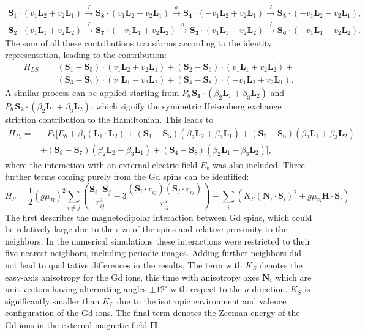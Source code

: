 \begin{align}
	\bm{S}_1\cdot(v_1 \bm{L}_2 + v_2 \bm{L}_1) \xrightarrow{I} \bm{S_8}\cdot(v_1 \bm{L}_2 - v_2 \bm{L}_1) \xrightarrow{a} \bm{S_4} \cdot (- v_1 \bm{L}_2 + v_2 \bm{L}_1) \xrightarrow{I} \bm{S_5} \cdot (-v_1 \bm{L}_2 - v_2 \bm{L}_1), \nonumber\\
	\bm{S}_2\cdot(v_1 \bm{L}_1 + v_2 \bm{L}_2) \xrightarrow{I} \bm{S_7}\cdot(-v_1 \bm{L}_1 + v_2 \bm{L}_2) \xrightarrow{a} \bm{S_3} \cdot (v_1 \bm{L}_1 - v_2 \bm{L}_2) \xrightarrow{I} \bm{S_6} \cdot (-v_1 \bm{L}_1 - v_2 \bm{L}_2).
\end{align}
The sum of all these contributions transforms according to the identity representation, leading to the contribution:
\begin{align}
    H_{LS} =& (\bm{S}_1 - \bm{S}_5) \cdot (v_1 \bm{L}_2 + v_2 \bm{L}_1) + (\bm{S}_2 - \bm{S}_6) \cdot (v_1 \bm{L}_1 + v_2 \bm{L}_2) + \nonumber \\ &(\bm{S}_3 - \bm{S}_7) \cdot (v_1 \bm{L}_1 - v_2 \bm{L}_2) + (\bm{S}_4 - \bm{S}_8) \cdot (-v_1 \bm{L}_2 + v_2 \bm{L}_1).
\end{align}
A similar process can be applied starting from $P_b \, \bm{S_1}\cdot(\beta_2 \bm{L}_1 + \beta_3 \bm{L}_2)$ and $P_b\, \bm{S_2}\cdot(\beta_2 \bm{L}_1 + \beta_3 \bm{L}_2)$, which signify the symmetric Heisenberg exchange striction contribution to the Hamiltonian. This leads to
\begin{align}
	H_{P_b}=&-P_b[E_b + \beta_1 (\bm{L}_1\cdot \bm{L}_2)+
    (\bm{S}_1-\bm{S}_5)(\beta_2 \bm{L}_2 + \beta_3 \bm{L}_1) +
    (\bm{S}_2-\bm{S}_6)(\beta_2 \bm{L}_1 + \beta_3 \bm{L}_2) \nonumber\\ 
    &+(\bm{S}_3-\bm{S}_7)(\beta_2 \bm{L}_2 - \beta_3 \bm{L}_1) +
    (\bm{S}_4-\bm{S}_8)(\beta_2 \bm{L}_1 - \beta_3 \bm{L}_2)],
\end{align}
where the interaction with an external electric field $E_b$ was also included. 
Three further terms coming purely from the Gd spins can be identified:
\begin{equation}
     H_S=\frac{1}{2}(g \mu_B)^2\sum_{i\neq j}\left(\frac{\bm{S}_i\cdot \bm{S}_j}{r_{ij}^3}-3\frac{(\bm{S}_i\cdot \bm{r}_{ij})(\bm{S}_j\cdot \bm{r}_{ij})}{r_{ij}^5}\right) - \sum_i\left( K_S(\bm{N}_i\cdot \bm{S}_i)^2 + g\mu_\mathrm{B} \bm{H} \cdot \bm{S}_i\right) 
\end{equation}
The first describes the magnetodipolar interaction between Gd spins, which could be relatively large due to the size of the spins and relative proximity to the neighbors. In the numerical simulations these interactions were restricted to their five nearest neighbors, including periodic images. Adding further neighbors did not lead to qualitative differences in the results. The term with $K_S$ denotes the easy-axis anisotropy for the Gd ions, this time with anisotropy axes $\bm{N}_i$ which are unit vectors having alternating angles $\pm 12^\circ$ with respect to the $a$-direction. $K_S$ is significantly smaller than $K_L$ due to the isotropic environment and valence configuration of the Gd ions.
The final term denotes the Zeeman energy of the Gd ions in the external magnetic field $\bm{H}$.


